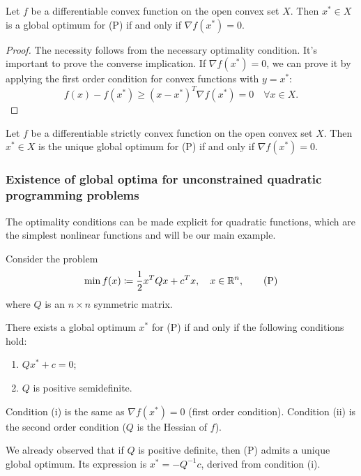 \begin{theorem}
    Let $f$ be a differentiable convex function on the open convex set $X$. Then $x^* \in X$ is a global optimum for (P) if and only if $\nabla f(x^*)=0$.
\end{theorem}
\begin{proof}
The necessity follows from the necessary optimality condition. It's important to prove the converse implication. If $\nabla f(x^*)=0$, we can prove it by applying the first order condition for convex functions with $y=x^*$:
\[
    f(x) - f(x^*) \ge (x-x^*)^T \nabla f(x^*) = 0 \quad \forall x \in X.
\]
\end{proof}

\begin{theorem}
    Let $f$ be a differentiable strictly convex function on the open convex set $X$. Then $x^* \in X$ is the unique global optimum for (P) if and only if $\nabla f(x^*)=0$.
\end{theorem}

\subsubsection{Existence of global optima for unconstrained quadratic programming problems}

The optimality conditions can be made explicit for quadratic functions, which are the simplest nonlinear functions and will be our main example.

Consider the problem
\[
    \min f(x) \coloneqq \frac{1}{2}x^TQx+c^Tx, \quad x\in \mathbb{R}^n, \tag{P}
\]
where $Q$ is an $n \times n$ symmetric matrix.

\begin{corollary}
    There exists a global optimum $x^*$ for (P) if and only if the following conditions hold:
    \begin{enumerate}[label=(\roman*)]
        \item $Qx^*+c=0$;
        \item $Q$ is positive semidefinite.
    \end{enumerate}
\end{corollary}

Condition (i) is the same as $\nabla f(x^*) = 0$ (first order condition).
Condition (ii) is the second order condition ($Q$ is the Hessian of $f$).

\begin{remark}
    We already observed that if $Q$ is positive definite, then (P) admits a unique global optimum. Its expression is $x^* = -Q^{-1}c$, derived from condition (i).
\end{remark}

